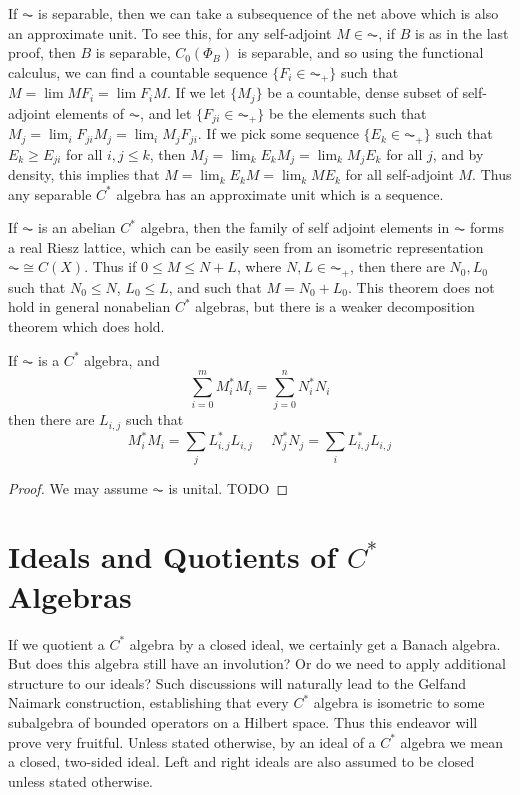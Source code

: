 \begin{remark}
    If $\AC$ is separable, then we can take a subsequence of the net above which is also an approximate unit. To see this, for any self-adjoint $M \in \AC$, if $B$ is as in the last proof, then $B$ is separable, $C_0(\Phi_B)$ is separable, and so using the functional calculus, we can find a countable sequence $\{ F_i \in \AC_+ \}$ such that $M = \lim MF_i = \lim F_iM$. If we let $\{ M_j \}$ be a countable, dense subset of self-adjoint elements of $\AC$, and let $\{ F_{ji} \in \AC_+ \}$ be the elements such that $M_j = \lim_i F_{ji} M_j = \lim_i M_j F_{ji}$. If we pick some sequence $\{ E_k \in \AC_+ \}$ such that $E_k \geq E_{ji}$ for all $i,j \leq k$, then $M_j = \lim_k E_k M_j = \lim_k M_j E_k$ for all $j$, and by density, this implies that $M = \lim_k E_k M = \lim_k M E_k$ for all self-adjoint $M$. Thus any separable $C^*$ algebra has an approximate unit which is a sequence.
\end{remark}

If $\AC$ is an abelian $C^*$ algebra, then the family of self adjoint elements in $\AC$ forms a real Riesz lattice, which can be easily seen from an isometric representation $\AC \cong C(X)$. Thus if $0 \leq M \leq N + L$, where $N,L \in \AC_+$, then there are $N_0,L_0$ such that $N_0 \leq N$, $L_0 \leq L$, and such that $M = N_0 + L_0$. This theorem does not hold in general nonabelian $C^*$ algebras, but there is a weaker decomposition theorem which does hold.

\begin{prop}
    If $\AC$ is a $C^*$ algebra, and
    \[ \sum_{i = 0}^m M_i^* M_i = \sum_{j = 0}^n N_i^* N_i \]
    then there are $L_{i,j}$ such that
    \[ M_i^* M_i = \sum_j L_{i,j}^* L_{i,j}\ \ \ \ \ \ N_j^* N_j = \sum_i L_{i,j}^* L_{i,j} \]
\end{prop}
\begin{proof}
    We may assume $\AC$ is unital. TODO
\end{proof}







\section{Ideals and Quotients of $C^*$ Algebras}

If we quotient a $C^*$ algebra by a closed ideal, we certainly get a Banach algebra. But does this algebra still have an involution? Or do we need to apply additional structure to our ideals? Such discussions will naturally lead to the Gelfand Naimark construction, establishing that every $C^*$ algebra is isometric to some subalgebra of bounded operators on a Hilbert space. Thus this endeavor will prove very fruitful. Unless stated otherwise, by an ideal of a $C^*$ algebra we mean a closed, two-sided ideal. Left and right ideals are also assumed to be closed unless stated otherwise.

